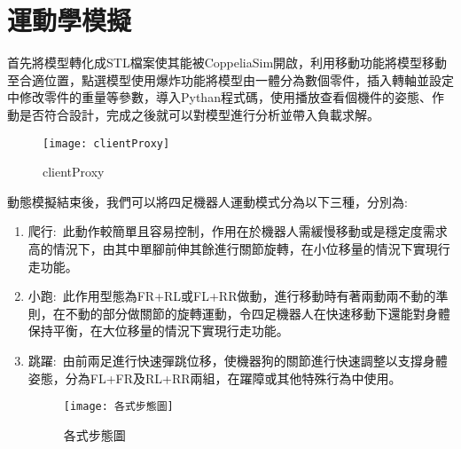 \section{運動學模擬}
首先將模型轉化成STL檔案使其能被CoppeliaSim開啟，利用移動功能將模型移動至合適位置，點選模型使用爆炸功能將模型由一體分為數個零件，插入轉軸並設定中修改零件的重量等參數，導入Pythan程式碼，使用播放查看個機件的姿態、作動是否符合設計，完成之後就可以對模型進行分析並帶入負載求解。\\

\begin{figure}[hbt!]
\begin{center}
\texttt{[image: clientProxy]}
\caption{\Large clientProxy}\label{clientProxy}
\end{center}
\end{figure}

動態模擬結束後，我們可以將四足機器人運動模式分為以下三種，分別為:\
\begin{enumerate}
\item 爬行:\
此動作較簡單且容易控制，作用在於機器人需緩慢移動或是穩定度需求高的情況下，由其中單腳前伸其餘進行關節旋轉，在小位移量的情況下實現行走功能。\\
\item 小跑:\
此作用型態為FR+RL或FL+RR做動，進行移動時有著兩動兩不動的準則，在不動的部分做關節的旋轉運動，令四足機器人在快速移動下還能對身體保持平衡，在大位移量的情況下實現行走功能。\\
\item 跳躍:\
由前兩足進行快速彈跳位移，使機器狗的關節進行快速調整以支撐身體姿態，分為FL+FR及RL+RR兩組，在躍障或其他特殊行為中使用。\\

\begin{figure}[hbt!]
\begin{center}
\texttt{[image: 各式步態圖]}
\caption{\Large 各式步態圖}\label{各式步態圖}
\end{center}
\end{figure}
\end{enumerate}
\newpage
